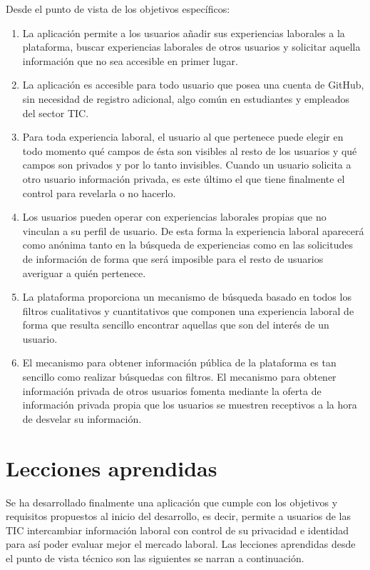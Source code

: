 \documentclass[a4paper, 12pt]{book}
\begin{document}
    Desde el punto de vista de los objetivos específicos:

    \begin{enumerate}
        \item La aplicación permite a los usuarios añadir sus experiencias laborales a la plataforma,
        buscar experiencias laborales de otros usuarios y solicitar aquella información que no sea accesible en primer lugar.
        \item La aplicación es accesible para todo usuario que posea una cuenta de GitHub, sin necesidad de registro adicional,
        algo común en estudiantes y empleados del sector TIC.
        \item Para toda experiencia laboral, el usuario al que pertenece puede elegir en todo momento qué campos de ésta son visibles
        al resto de los usuarios y qué campos son privados y por lo tanto invisibles.
        Cuando un usuario solicita a otro usuario información privada, es este último el que tiene finalmente el control para revelarla o no hacerlo.
        \item Los usuarios pueden operar con experiencias laborales propias que no vinculan a su perfil de usuario.
        De esta forma la experiencia laboral aparecerá como anónima tanto en la búsqueda de experiencias como en las solicitudes de información
        de forma que será imposible para el resto de usuarios averiguar a quién pertenece.
        \item La plataforma proporciona un mecanismo de búsqueda basado en todos los filtros cualitativos y cuantitativos que componen una
        experiencia laboral de forma que resulta sencillo encontrar aquellas que son del interés de un usuario.
        \item El mecanismo para obtener información pública de la plataforma es tan sencillo como realizar búsquedas con filtros.
        El mecanismo para obtener información privada de otros usuarios fomenta mediante la oferta de información privada propia que los usuarios
        se muestren receptivos a la hora de desvelar su información.
    \end{enumerate}


    \section{Lecciones aprendidas}
    \label{sec:lecciones_aprendidas}
    Se ha desarrollado finalmente una aplicación que cumple con los objetivos y requisitos propuestos al inicio del desarrollo,
    es decir, permite a usuarios de las TIC intercambiar información laboral con control de su privacidad e identidad para así poder
    evaluar mejor el mercado laboral.
    Las lecciones aprendidas desde el punto de vista técnico son las siguientes se narran a continuación.
\end{document}
